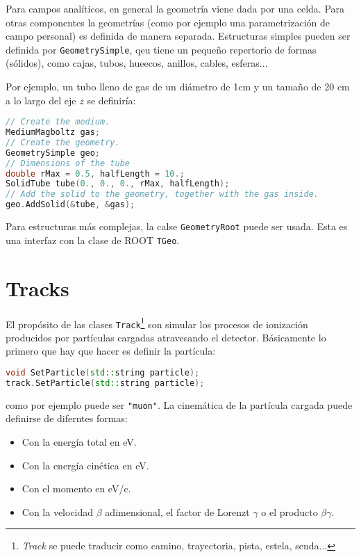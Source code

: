 Para campos analíticos, en general la geometría viene dada por una celda. Para otras componentes la geometrías (como por ejemplo una parametrización de campo personal) es definida de manera separada. Estructuras simples pueden ser definida por \texttt{GeometrySimple}, qeu tiene un pequeño repertorio de formas (sólidos), como cajas, tubos, hueecos, anillos, cables, esferas...  

Por ejemplo, un tubo lleno de gas de un diámetro de 1cm y un tamaño de 20 cm a lo largo del eje $z$ se definiría: \\

\begin{lstlisting}[language=C++,style=c++]
// Create the medium.
MediumMagboltz gas;
// Create the geometry.
GeometrySimple geo;
// Dimensions of the tube
double rMax = 0.5, halfLength = 10.;
SolidTube tube(0., 0., 0., rMax, halfLength);
// Add the solid to the geometry, together with the gas inside.
geo.AddSolid(&tube, &gas);
\end{lstlisting}
\vspace*{0.7em}

Para estructuras más complejas, la calse \texttt{GeometryRoot} puede ser usada. Esta es una interfaz con la clase de ROOT \texttt{TGeo}.



\section{Tracks}

El propósito de las clases \texttt{Track}\footnote{\textit{Track} se puede traducir como camino, trayectoria, pista, estela, senda...} son simular los procesos de ionización producidos por partículas cargadas atravesando el detector. Básicamente lo primero que hay que hacer es definir la partícula: \\

\begin{lstlisting}[language=C++,style=c++]
void SetParticle(std::string particle);
track.SetParticle(std::string particle);
\end{lstlisting}
\vspace*{0.7em}
como por ejemplo puede ser  \texttt{"muon"}. La cinemática de la partícula cargada puede definirse de diferntes formas:

\begin{itemize}
    \item Con la energía total en eV.
    \item Con la energía cinética en eV.
    \item Con el momento en eV/c.
    \item Con la velocidad $\beta$ adimensional, el factor de Lorenzt $\gamma$ o el producto $\beta\gamma$. 
\end{itemize}

